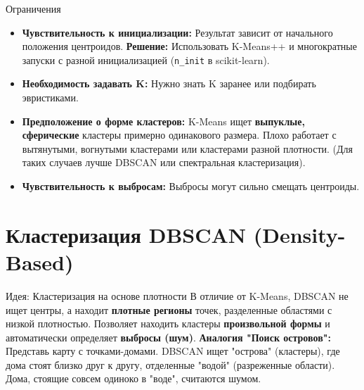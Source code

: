 \begin{alerttextbox}{Ограничения}
    \begin{itemize}
        \item \textbf{Чувствительность к инициализации:} Результат зависит от начального положения центроидов. \textbf{Решение:} Использовать K-Means++ и многократные запуски с разной инициализацией (\texttt{n\_init} в scikit-learn).
        \item \textbf{Необходимость задавать K:} Нужно знать K заранее или подбирать эвристиками.
        \item \textbf{Предположение о форме кластеров:} K-Means ищет \textbf{выпуклые, сферические} кластеры примерно одинакового размера. Плохо работает с вытянутыми, вогнутыми кластерами или кластерами разной плотности. (Для таких случаев лучше DBSCAN или спектральная кластеризация).
        \item \textbf{Чувствительность к выбросам:} Выбросы могут сильно смещать центроиды.
    \end{itemize}
\end{alerttextbox}

\section{Кластеризация DBSCAN (Density-Based)}

\begin{myblock}{Идея: Кластеризация на основе плотности}
    В отличие от K-Means, DBSCAN не ищет центры, а находит \textbf{плотные регионы} точек, разделенные областями с низкой плотностью. Позволяет находить кластеры \textbf{произвольной формы} и автоматически определяет \textbf{выбросы (шум)}.
    \vspace{0.5ex}
    \textbf{Аналогия "Поиск островов":} Представь карту с точками-домами. DBSCAN ищет "острова" (кластеры), где дома стоят близко друг к другу, отделенные "водой" (разреженные области). Дома, стоящие совсем одиноко в "воде", считаются шумом.
\end{myblock}


